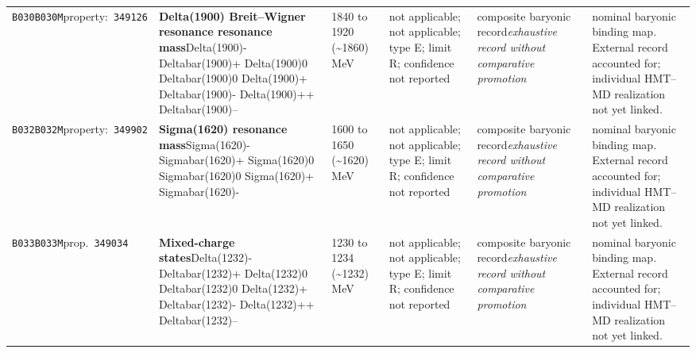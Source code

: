 \begin{landscape}
\begin{longtable}{L{1.85cm}L{4.45cm}L{2.35cm}L{4.05cm}L{3.35cm}L{7.15cm}}
\texttt{B030}\newline \texttt{B030M}\newline property:\ \texttt{349126} & \textbf{Delta(1900) Breit--Wigner resonance resonance mass}\newline Delta(1900)- \textbar{}\allowbreak{} Deltabar(1900)+ \textbar{}\allowbreak{} Delta(1900)0 \textbar{}\allowbreak{} Deltabar(1900)0 \textbar{}\allowbreak{} Delta(1900)+ \textbar{}\allowbreak{} Deltabar(1900)- \textbar{}\allowbreak{} Delta(1900)++ \textbar{}\allowbreak{} Deltabar(1900)-- & 1840 to 1920 (\textasciitilde{}1860)\,MeV & not applicable; not applicable; type E; limit R; confidence not reported & composite baryonic record\newline \emph{exhaustive record without comparative promotion} & nominal baryonic binding map. External record accounted for; individual HMT--MD realization not yet linked. \\
\texttt{B032}\newline \texttt{B032M}\newline property:\ \texttt{349902} & \textbf{Sigma(1620) resonance mass}\newline Sigma(1620)- \textbar{}\allowbreak{} Sigmabar(1620)+ \textbar{}\allowbreak{} Sigma(1620)0 \textbar{}\allowbreak{} Sigmabar(1620)0 \textbar{}\allowbreak{} Sigma(1620)+ \textbar{}\allowbreak{} Sigmabar(1620)- & 1600 to 1650 (\textasciitilde{}1620)\,MeV & not applicable; not applicable; type E; limit R; confidence not reported & composite baryonic record\newline \emph{exhaustive record without comparative promotion} & nominal baryonic binding map. External record accounted for; individual HMT--MD realization not yet linked. \\
\texttt{B033}\newline \texttt{B033M}\newline prop.\ \texttt{349034} & \textbf{Mixed-charge states}\newline Delta(1232)- \textbar{}\allowbreak{} Deltabar(1232)+ \textbar{}\allowbreak{} Delta(1232)0 \textbar{}\allowbreak{} Deltabar(1232)0 \textbar{}\allowbreak{} Delta(1232)+ \textbar{}\allowbreak{} Deltabar(1232)- \textbar{}\allowbreak{} Delta(1232)++ \textbar{}\allowbreak{} Deltabar(1232)-- & 1230 to 1234 (\textasciitilde{}1232)\,MeV & not applicable; not applicable; type E; limit R; confidence not reported & composite baryonic record\newline \emph{exhaustive record without comparative promotion} & nominal baryonic binding map. External record accounted for; individual HMT--MD realization not yet linked. \\

\end{longtable}
\end{landscape}

